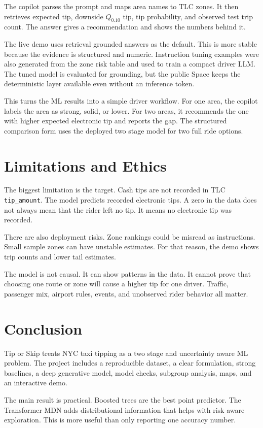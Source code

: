 \documentclass[11pt]{article}
\begin{document}
The copilot parses the prompt and maps area names to TLC zones. It then retrieves expected tip, downside $Q_{0.10}$ tip, tip probability, and observed test trip count. The answer gives a recommendation and shows the numbers behind it.

The live demo uses retrieval grounded answers as the default. This is more stable because the evidence is structured and numeric. Instruction tuning examples were also generated from the zone risk table and used to train a compact driver LLM. The tuned model is evaluated for grounding, but the public Space keeps the deterministic layer available even without an inference token.

This turns the ML results into a simple driver workflow. For one area, the copilot labels the area as strong, solid, or lower. For two areas, it recommends the one with higher expected electronic tip and reports the gap. The structured comparison form uses the deployed two stage model for two full ride options.

\section{Limitations and Ethics}
The biggest limitation is the target. Cash tips are not recorded in TLC \texttt{tip\_amount}. The model predicts recorded electronic tips. A zero in the data does not always mean that the rider left no tip. It means no electronic tip was recorded.

There are also deployment risks. Zone rankings could be misread as instructions. Small sample zones can have unstable estimates. For that reason, the demo shows trip counts and lower tail estimates.

The model is not causal. It can show patterns in the data. It cannot prove that choosing one route or zone will cause a higher tip for one driver. Traffic, passenger mix, airport rules, events, and unobserved rider behavior all matter.

\section{Conclusion}
Tip or Skip treats NYC taxi tipping as a two stage and uncertainty aware ML problem. The project includes a reproducible dataset, a clear formulation, strong baselines, a deep generative model, model checks, subgroup analysis, maps, and an interactive demo.

The main result is practical. Boosted trees are the best point predictor. The Transformer MDN adds distributional information that helps with risk aware exploration. This is more useful than only reporting one accuracy number.
\end{document}
